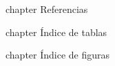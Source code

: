 \documentclass[doctorado]{iietesis}
\begin{document}
\backmatter


\newpage{} {chapter} {Referencias}%



\newpage{} {chapter} {\'Indice de tablas}%
\listoftables %

\newpage\newpage{} {chapter} {\'Indice de figuras}%
\listoffigures %




\lastpage
\end{document}
